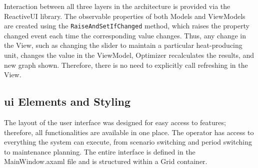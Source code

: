 Interaction between all three layers in the architecture is provided via the ReactiveUI library. The observable properties of both Models and ViewModels are created using the \texttt{RaiseAndSetIfChanged} method, which raises the property changed event each time the corresponding value changes. Thus, any change in the View, such as changing the slider to maintain a particular heat-producing unit, changes the value in the ViewModel, Optimizer recalculates the results, and new graph shown. Therefore, there is no need to explicitly call refreshing in the View.

\subsection{\acrshort{ui} Elements and Styling}
The layout of the user interface was designed for easy access to features; therefore, all functionalities are available in one place. The operator has access to everything the system can execute, from scenario switching and period switching to maintenance planning. The entire interface is defined in the MainWindow.axaml file and is structured within a Grid container.

